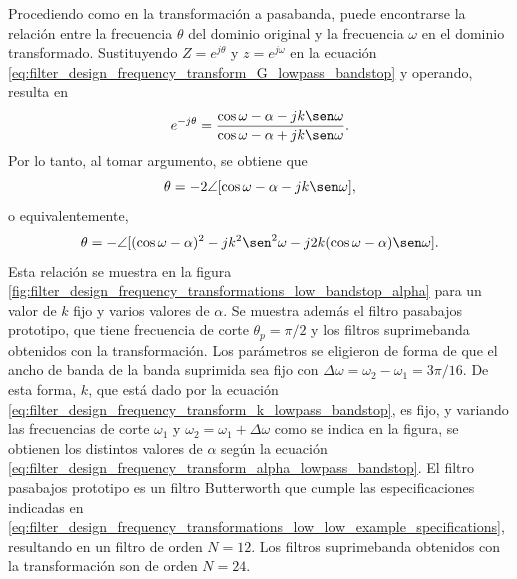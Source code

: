 \documentclass[a4paper]{report}
\begin{document}
Procediendo como en la transformación a pasabanda, puede encontrarse la relación entre la frecuencia \(\theta\) del dominio original y la frecuencia \(\omega\) en el dominio transformado. Sustituyendo \(Z=e^{j\theta}\) y \(z=e^{j\omega}\) en la ecuación \ref{eq:filter_design_frequency_transform_G_lowpass_bandstop} y operando, resulta en
\[
 e^{-j\theta}=\frac{\cos\omega-\alpha-jk\sen\omega}{\cos\omega-\alpha+jk\sen\omega}.
\]
Por lo tanto, al tomar argumento, se obtiene que 
\[
 \theta=-2\angle[\cos\omega-\alpha-jk\sen\omega],
\]
o equivalentemente,
\[
 \theta=-\angle[(\cos\omega-\alpha)^2-jk^2\sen^2\omega-j2k(\cos\omega-\alpha)\sen\omega].
\]
Esta relación se muestra en la figura \ref{fig:filter_design_frequency_transformations_low_bandstop_alpha} para un valor de \(k\) fijo y varios valores de \(\alpha\). Se muestra además el filtro pasabajos prototipo, que tiene frecuencia de corte \(\theta_p=\pi/2\) y los filtros suprimebanda obtenidos con la transformación. Los parámetros se eligieron de forma de que el ancho de banda de la banda suprimida sea fijo con \(\Delta\omega=\omega_2-\omega_1=3\pi/16\). De esta forma, \(k\), que está dado por la ecuación \ref{eq:filter_design_frequency_transform_k_lowpass_bandstop}, es fijo, y variando las frecuencias de corte \(\omega_1\) y \(\omega_2=\omega_1+\Delta\omega\) como se indica en la figura, se obtienen los distintos valores de \(\alpha\) según la ecuación \ref{eq:filter_design_frequency_transform_alpha_lowpass_bandstop}. El filtro pasabajos prototipo es un filtro Butterworth que cumple las especificaciones indicadas en \ref{eq:filter_design_frequency_transformations_low_low_example_specifications}, resultando en un filtro de orden \(N=12\). Los filtros suprimebanda obtenidos con la transformación son de orden \(N=24\).
\end{document}
